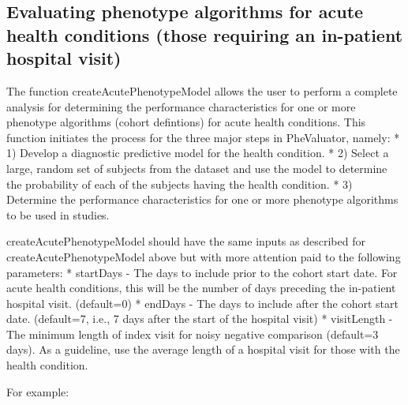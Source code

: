 \documentclass[
]{article}
\begin{document}
\hypertarget{evaluating-phenotype-algorithms-for-acute-health-conditions-those-requiring-an-in-patient-hospital-visit}{%
\subsection{Evaluating phenotype algorithms for acute health conditions
(those requiring an in-patient hospital
visit)}\label{evaluating-phenotype-algorithms-for-acute-health-conditions-those-requiring-an-in-patient-hospital-visit}}

The function createAcutePhenotypeModel allows the user to perform a
complete analysis for determining the performance characteristics for
one or more phenotype algorithms (cohort defintions) for acute health
conditions. This function initiates the process for the three major
steps in PheValuator, namely: * 1) Develop a diagnostic predictive model
for the health condition. * 2) Select a large, random set of subjects
from the dataset and use the model to determine the probability of each
of the subjects having the health condition. * 3) Determine the
performance characteristics for one or more phenotype algorithms to be
used in studies.

createAcutePhenotypeModel should have the same inputs as described for
createAcutePhenotypeModel above but with more attention paid to the
following parameters: * startDays - The days to include prior to the
cohort start date. For acute health conditions, this will be the number
of days preceding the in-patient hospital visit. (default=0) * endDays -
The days to include after the cohort start date. (default=7, i.e., 7
days after the start of the hospital visit) * visitLength - The minimum
length of index visit for noisy negative comparison (default=3 days). As
a guideline, use the average length of a hospital visit for those with
the health condition.

For example:
\end{document}
